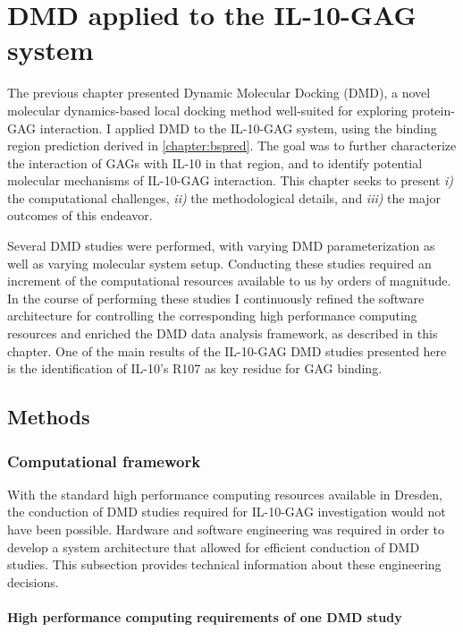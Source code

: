 \chapter{DMD applied to the IL-10-GAG system}

The previous chapter presented Dynamic Molecular Docking (DMD), a novel
molecular dynamics-based local docking method well-suited for exploring
protein-GAG interaction. I applied DMD to the IL-10-GAG system, using the
binding region prediction derived in \cref{chapter:bspred}. The goal was to
further characterize the interaction of GAGs with IL-10 in that region, and to
identify potential molecular mechanisms of IL-10-GAG interaction. This chapter
seeks to present \textit{i)} the computational challenges, \textit{ii)} the
methodological details, and \textit{iii)} the major outcomes of this endeavor.

Several DMD studies were performed, with varying DMD parameterization as well as
varying molecular system setup. Conducting these studies required an increment
of the computational resources available to us by orders of magnitude. In the
course of performing these studies I continuously refined the software
architecture for controlling the corresponding high performance computing
resources and enriched the DMD data analysis framework, as described in this
chapter. One of the main results of the IL-10-GAG DMD studies presented here is
the identification of IL-10's R107 as key residue for GAG binding.


\section{Methods}

\subsection{Computational framework}

With the standard high performance computing resources available in Dresden, the
conduction of DMD studies required for IL-10-GAG investigation would not have
been possible. Hardware and software engineering was required in order to
develop a system architecture that allowed for efficient conduction of DMD
studies. This subsection provides technical information about these engineering
decisions.

\subsubsection{High performance computing requirements of one DMD study}

